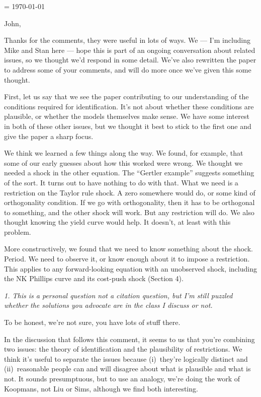 \documentclass[12pt]{article}
\begin{document}
\parskip=\bigskipamount
\parindent=0.0in
\thispagestyle{empty}
\today

John,

Thanks for the comments, they were useful in lots of ways.
We --- I'm including Mike and Stan here ---
hope this is part of an ongoing conversation about related issues,
so we thought we'd respond in some detail.
We've also rewritten the paper to address some of your comments,
and will do more once we've given this some thought.

First, let us say that we see the paper contributing to our understanding of the conditions required for identification.  It's not about whether these conditions are plausible, or whether the models themselves make sense.  We have some interest in both of these other issues,
but we thought it best to stick to the first one and give the paper a sharp focus.

We think we learned a few things along the way.
We found, for example, that some of our early guesses about how this worked
were wrong.
We thought we needed a shock in the other equation.
The ``Gertler example'' suggests something of the sort.
It turns out to have nothing to do with that.
What we need is a restriction on the Taylor rule shock.
A zero somewhere would do, or some kind of orthogonality condition.
If we go with orthogonality, then it has to be orthogonal to something,
and the other shock will work.
But any restriction will do.
We also thought knowing the yield curve would help.
It doesn't, at least with this problem.

More constructively, we found that we need to know something about the shock.
Period.
We need to observe it, or know enough about it to impose a restriction.
This applies to any forward-looking equation with an unobserved shock,
including the NK Phillips curve and its cost-push shock (Section 4).


{\it 1. This is a personal question not a citation question,
but I'm still puzzled whether the solutions you advocate are in the class I discuss or not.
\/}

To be honest, we're not sure, you have lots of stuff there.

In the discussion that follows this comment, it seems to us that
you're combining two issues:  the theory of identification and the plausibility of restrictions.
We think it's useful to separate the issues because
(i)~they're logically distinct and (ii)~reasonable people can and will disagree about what is plausible and what is not.  It sounds presumptuous,
but to use an analogy,
we're doing the work of Koopmans, not Liu or Sims,
although we find both interesting.
\end{document}
